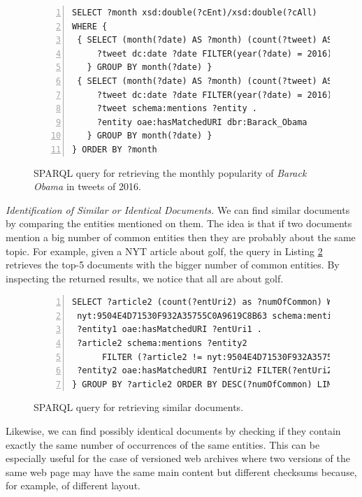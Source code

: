 \documentclass[twocolumn]{svjour3}
\begin{document}
\begin{figure}[th]
\centering
\scriptsize
\begin{Verbatim}[frame=lines,numbers=left,numbersep=1pt]
SELECT ?month xsd:double(?cEnt)/xsd:double(?cAll)
WHERE {
 { SELECT (month(?date) AS ?month) (count(?tweet) AS ?cAll) WHERE {
     ?tweet dc:date ?date FILTER(year(?date) = 2016)
   } GROUP BY month(?date) }
 { SELECT (month(?date) AS ?month) (count(?tweet) AS ?cEnt) WHERE {
     ?tweet dc:date ?date FILTER(year(?date) = 2016) .
     ?tweet schema:mentions ?entity .
     ?entity oae:hasMatchedURI dbr:Barack_Obama
   } GROUP BY month(?date) }
} ORDER BY ?month
\end{Verbatim}
\vspace{-4mm}
\caption{SPARQL query for retrieving the monthly popularity of {\em Barack Obama} in tweets of 2016.}
\label{fig:obamaPopularity}
\end{figure}

\vspace{2mm} \noindent
{\em Identification of Similar or Identical Documents.}
We can find similar documents by comparing the entities mentioned on them.
The idea is that if two documents mention a big number of common entities
then they are probably about the same topic.
For example, given a NYT article about golf,
the query in Listing \ref{fig:similarDocs} retrieves the top-5 documents with the
bigger number of common entities.
By inspecting the returned results, we notice that all are about golf.

\begin{figure}[th]
\centering
\scriptsize
\begin{Verbatim}[frame=lines,numbers=left,numbersep=1pt]
SELECT ?article2 (count(?entUri2) as ?numOfCommon) WHERE {
 nyt:9504E4D71530F932A35755C0A9619C8B63 schema:mentions ?entity1 .
 ?entity1 oae:hasMatchedURI ?entUri1 .
 ?article2 schema:mentions ?entity2
      FILTER (?article2 != nyt:9504E4D71530F932A35755C0A9619C8B63)
 ?entity2 oae:hasMatchedURI ?entUri2 FILTER(?entUri2 = ?entUri1) .
} GROUP BY ?article2 ORDER BY DESC(?numOfCommon) LIMIT 5
\end{Verbatim}
\vspace{-4mm}
\caption{SPARQL query for retrieving similar documents.}
\label{fig:similarDocs}
\end{figure}

Likewise, we can find possibly identical documents by checking if they
contain exactly the same number of occurrences of the same entities.
This can be especially useful for the case of versioned web archives where
two versions of the same web page may have the same main content
but different checksums because, for example, of different layout.
\end{document}
